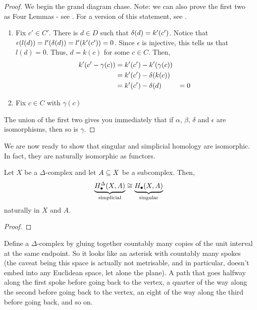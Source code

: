 \begin{proof}
    We begin the grand diagram chase. Note: we can also prove the first two as Four Lemmas - see \cite[Problem Sheet 5, Exercise 2]{EPFLRingsAndModules}. For a version of this statement, see \cite[Lemma 5.6.2]{EPFLRingsAndModules}.
    \begin{enumerate}
        \item Fix $c' \in C'$. There is $d \in D$ such that $\delta(d) = k'\!\left( c' \right)$. Notice that $\epsilon\!\left( l(d) \right) = l'\!\left( \delta(d) \right) = l'\!\left( k'\!\left( c' \right) \right) = 0$. Since $\epsilon$ is injective, this tells us that $l(d) = 0$. Thus, $d = k(c)$ for some $c \in C$. Then,
        \begin{align*}
            k'\!\left( c' - \gamma(c) \right)
            &= k'\!\left( c' \right) - k'\!\left( \gamma(c) \right) \\
            &= k'\!\left( c' \right) - \delta\!\left( k(c) \right) \\
            &= k'\!\left( c' \right) - \delta(d)
            &= 0
        \end{align*}
        \sorry

        \item Fix $c \in C$ with $\gamma(c)$
    \end{enumerate}
    The union of the first two gives you immediately that if $\alpha$, $\beta$, $\delta$ and $\epsilon$ are isomorphisms, then so is $\gamma$.
\end{proof}

We are now ready to show that singular and simplicial homology are isomorphic. In fact, they are naturally isomorphic as functors.

\begin{boxtheorem}
    Let $X$ be a $\Delta$-complex and let $A \subseteq X$ be a subcomplex. Then,
    \begin{align*}
        \underbrace{H_{\bullet}^{\Delta}\!\left( X, A \right)}_{\text{simplicial}}
        \cong
        \underbrace{H_{\bullet}\!\left( X, A \right)}_{\text{singular}}
    \end{align*}
    naturally in $X$ and $A$.
\end{boxtheorem}
\begin{proof}
    
\end{proof}

\begin{boxexample}
    Define a $\Delta$-complex by gluing together countably many copies of the unit interval at the same endpoint. So it looks like an asterisk with countably many spokes (the caveat being this space is actually not metrisable, and in particular, doesn't embed into any Euclidean space, let alone the plane). A path that goes halfway along the first spoke before going back to the vertex, a quarter of the way along the second before going back to the vertex, an eight of the way along the third before going back, and so on. 
\end{boxexample}